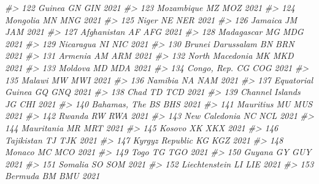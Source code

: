 \documentclass[
  xelatex, ja=standard]{bxjsbook}
\newenvironment{Shaded}{\begin{snugshade}}{\end{snugshade}}
\newcommand{\CommentTok}[1]{\textcolor[rgb]{0.56,0.35,0.01}{\textit{#1}}}
\theoremstyle{definition}
\theoremstyle{definition}
\theoremstyle{definition}
\theoremstyle{definition}
\theoremstyle{remark}
\begin{document}
\begin{Shaded}
\begin{Highlighting}[]
\CommentTok{\#\textgreater{} 122                         Guinea    GN   GIN 2021}
\CommentTok{\#\textgreater{} 123                     Mozambique    MZ   MOZ 2021}
\CommentTok{\#\textgreater{} 124                       Mongolia    MN   MNG 2021}
\CommentTok{\#\textgreater{} 125                          Niger    NE   NER 2021}
\CommentTok{\#\textgreater{} 126                        Jamaica    JM   JAM 2021}
\CommentTok{\#\textgreater{} 127                    Afghanistan    AF   AFG 2021}
\CommentTok{\#\textgreater{} 128                     Madagascar    MG   MDG 2021}
\CommentTok{\#\textgreater{} 129                      Nicaragua    NI   NIC 2021}
\CommentTok{\#\textgreater{} 130              Brunei Darussalam    BN   BRN 2021}
\CommentTok{\#\textgreater{} 131                        Armenia    AM   ARM 2021}
\CommentTok{\#\textgreater{} 132                North Macedonia    MK   MKD 2021}
\CommentTok{\#\textgreater{} 133                        Moldova    MD   MDA 2021}
\CommentTok{\#\textgreater{} 134                    Congo, Rep.    CG   COG 2021}
\CommentTok{\#\textgreater{} 135                         Malawi    MW   MWI 2021}
\CommentTok{\#\textgreater{} 136                        Namibia    NA   NAM 2021}
\CommentTok{\#\textgreater{} 137              Equatorial Guinea    GQ   GNQ 2021}
\CommentTok{\#\textgreater{} 138                           Chad    TD   TCD 2021}
\CommentTok{\#\textgreater{} 139                Channel Islands    JG   CHI 2021}
\CommentTok{\#\textgreater{} 140                   Bahamas, The    BS   BHS 2021}
\CommentTok{\#\textgreater{} 141                      Mauritius    MU   MUS 2021}
\CommentTok{\#\textgreater{} 142                         Rwanda    RW   RWA 2021}
\CommentTok{\#\textgreater{} 143                  New Caledonia    NC   NCL 2021}
\CommentTok{\#\textgreater{} 144                     Mauritania    MR   MRT 2021}
\CommentTok{\#\textgreater{} 145                         Kosovo    XK   XKX 2021}
\CommentTok{\#\textgreater{} 146                     Tajikistan    TJ   TJK 2021}
\CommentTok{\#\textgreater{} 147                Kyrgyz Republic    KG   KGZ 2021}
\CommentTok{\#\textgreater{} 148                         Monaco    MC   MCO 2021}
\CommentTok{\#\textgreater{} 149                           Togo    TG   TGO 2021}
\CommentTok{\#\textgreater{} 150                         Guyana    GY   GUY 2021}
\CommentTok{\#\textgreater{} 151                        Somalia    SO   SOM 2021}
\CommentTok{\#\textgreater{} 152                  Liechtenstein    LI   LIE 2021}
\CommentTok{\#\textgreater{} 153                        Bermuda    BM   BMU 2021}

\end{Highlighting}
\end{Shaded}
\end{document}
